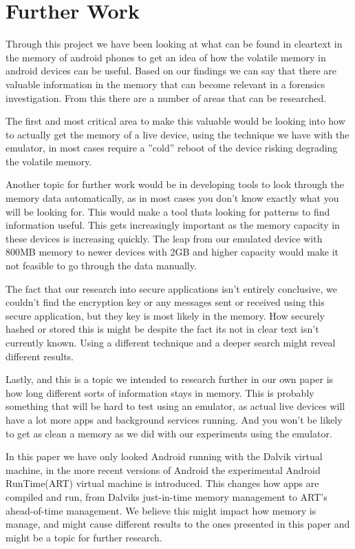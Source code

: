 \section{Further Work}
Through this project we have been looking at what can be
found in cleartext in the memory of android phones to get
an idea of how the volatile memory in android devices can
be useful. Based on our findings we can say that there are
valuable information in the memory that can become relevant
in a forensics investigation. From this there are a number of
areas that can be researched.

The first and most critical area to make this valuable would
be looking into how to actually get the memory of a live
device, using the technique we have with the emulator, in most
cases require a ”cold” reboot of the device risking degrading
the volatile memory.

Another topic for further work would be in developing tools
to look through the memory data automatically, as in most
cases you don’t know exactly what you will be looking for.
This would make a tool thats looking for patterns to find information useful.
This gets increasingly important as the memory capacity
in these devices is increasing quickly. The leap from our
emulated device with 800MB memory to newer devices with
2GB and higher capacity would make it not feasible to go
through the data manually.

The fact that our research into secure applications isn’t
entirely conclusive, we couldn’t find the encryption key or any
messages sent or received using this secure application, but
they key is most likely in the memory. How securely hashed
or stored this is might be despite the fact its not in clear text
isn’t currently known. Using a different technique and a deeper
search might reveal different results.

Lastly, and this is a topic we intended to research further
in our own paper is how long different sorts of information
stays in memory. This is probably something that will be hard
to test using an emulator, as actual live devices will have a lot
more apps and background services running. And you won’t be
likely to get as clean a memory as we did with our experiments
using the emulator.

In this paper we have only looked Android running with
the Dalvik virtual machine, in the more recent versions of
Android the experimental Android RunTime(ART) virtual
machine is introduced. This changes how apps are compiled
and run, from Dalviks just-in-time memory management to
ART’s ahead-of-time management. We believe this might
impact how memory is manage, and might cause different
results to the ones presented in this paper and might be a
topic for further research.

